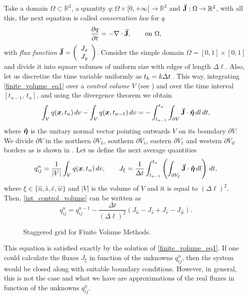 Take a domain $\Omega \subset \mathbb{R}^2$, a quantity $q:\Omega\times [0,+\infty[ \rightarrow \mathbb{R}^2$ and $\vec{\mathbf{J}}:\Omega \rightarrow \mathbb{R}^2$, with all this, the next equation is called \emph{conservation law} for $q$
\begin{equation}
\frac{\partial q}{\partial t}=-\nabla \cdot \veca{J},\qquad\text{on } \Omega,\label{eq:finite_volume_eq1}
\end{equation} 
with \emph{flux function} $\vec{\mathbf{J}}=\left(\begin{array}{c}
J_x\\J_y
\end{array}\right)$. Consider the simple domain $\Omega=[0,1]\times [0,1]$ and divide it into square volumes of uniform size with edges of length $\Delta \ell$. Also, let us discretize the time variable uniformly as $t_{k} =k\nobreak\Delta t\,$. This way, integrating \eqref{finite_volume_eq1} over a \emph{control volume} $V$  (see ) and over the time interval $[t_{n-1},\,t_{n}]$, and using the divergence theorem we obtain
\begin{equation}
\int_V q(\bds{x},t_{n})\,dv-\int_V q(\bds{x},t_{n-1})\,dv=-\int_{t_{n-1}}^{t_{n}}\int_{\partial V}\veca{J}\cdot \bds{\hat{\eta}}\,dl\,dt,\label{eq:int_control_volume}
\end{equation}
where $\boldsymbol{\hat{\eta}}$ is the unitary normal vector pointing outwards $V$ on its boundary $\partial V$. We divide $\partial V$ in the northern $\partial V_{\hat{n}}$, southern $\partial V_{\hat{s}}$, eastern $\partial V_{\hat{e}}$ and western $\partial V_{\hat{w}}$ borders as is shown in . Let us define the next average quantities
$$q^n_{ij}=\frac{1}{|V|}\int_V q(\boldsymbol{x},t_n)\,dv,\qquad J_\xi = \frac{1}{\Delta t}\int_{t_{n-1}}^{t_{n}}\left(\int_{\partial V_\xi} \vec{\mathbf{J}}\cdot \boldsymbol{\hat{\eta}}\,dl\right)\,dt,$$
where $\xi\in \{\hat{n},\hat{s},\hat{e},\hat{w}\}$ and  $|V|$ is the volume of $V$ and it is equal to $(\Delta \ell) ^2$. Then, \eqref{int_control_volume} can be written as
\begin{equation}
q^{n}_{ij}=q^{n-1}_{ij}-\frac{\Delta t}{(\Delta \ell)
^2}\left(J_{\hat{n}}-J_{\hat{s}}+J_{\hat{e}}-J_{\hat{w}}\right).
\label{eq:finite_volume_exact}
\end{equation}
\begin{figure}[ht!]
\centering 
\def\svgwidth{\textwidth}\small{
}\caption[Finite volume control]{Staggered grid for Finite Volume Methods.}\label{fig:finite_volume_scheme}
\end{figure}
This equation is satisfied exactly by the solution of \eqref{finite_volume_eq1}. If one could calculate the fluxes $J_\xi$ in function of the unknowns $q^{n}_{ij}$, then the system would be closed along with suitable boundary conditions. However, in general, this is not the case and what we have are approximations of the real fluxes in function of the unknowns $q^{n}_{ij}$. 

